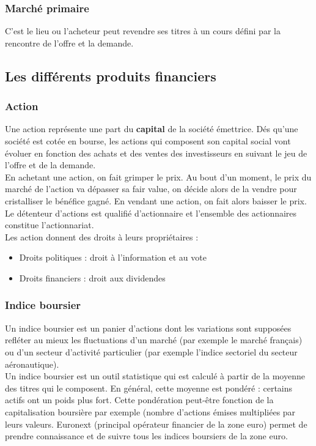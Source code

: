 \subsubsection{Marché primaire}
C'est le lieu ou l'acheteur peut revendre ses titres à un cours défini par la rencontre de l'offre et la demande. 

\subsection{Les différents produits financiers}

\subsubsection{Action}
Une action représente une part du \textbf{capital} de la société émettrice. Dés qu'une société est cotée en bourse, les actions qui composent son capital social vont évoluer en fonction des achats et des ventes des investisseurs en suivant le jeu de l'offre et de la demande.  \\
En achetant une action, on fait grimper le prix. Au bout d’un moment, le prix du marché de l’action va dépasser sa fair value, on décide alors de la vendre pour cristalliser le bénéfice gagné. En vendant une action, on fait alors baisser le prix.\\ 

Le détenteur d'actions est qualifié d'actionnaire et l'ensemble des actionnaires constitue l'actionnariat. \\


Les action donnent des droits à leurs propriétaires : 
\begin{itemize}
\item Droits politiques : droit à l'information et au vote
\item Droits financiers : droit aux dividendes
\end{itemize}

\subsubsection{Indice boursier}
Un indice boursier est un panier d'actions dont les variations sont supposées refléter au mieux les fluctuations d'un marché (par exemple le marché français) ou d'un secteur d'activité particulier (par exemple l'indice sectoriel du secteur aéronautique). \\

Un indice boursier est un outil statistique qui est calculé à partir de la moyenne des titres qui le composent. En général, cette moyenne est pondéré : certains actifs ont un poids plus fort. Cette pondération peut-être fonction de la capitalisation boursière par exemple (nombre d'actions émises multipliées par leurs valeurs. Euronext (principal opérateur financier de la zone euro) permet de prendre connaissance et de suivre tous les indices boursiers de la zone euro.  \\

